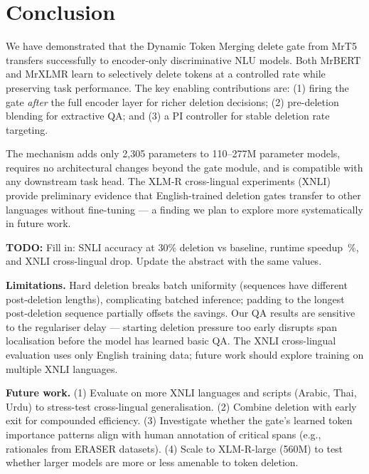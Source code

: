\documentclass[11pt,a4paper]{article}
\newcommand{\todo}[1]{\begin{mdframed}[style=todostyle]\textcolor{todocolor}{\textbf{TODO:}} #1\end{mdframed}}
\begin{document}
\section{Conclusion}
\label{sec:conclusion}

We have demonstrated that the Dynamic Token Merging delete gate from MrT5 transfers successfully to encoder-only discriminative NLU models. Both MrBERT and MrXLMR learn to selectively delete tokens at a controlled rate while preserving task performance. The key enabling contributions are: (1) firing the gate \emph{after} the full encoder layer for richer deletion decisions; (2) pre-deletion blending for extractive QA; and (3) a PI controller for stable deletion rate targeting.

The mechanism adds only 2,305 parameters to 110--277M parameter models, requires no architectural changes beyond the gate module, and is compatible with any downstream task head. The XLM-R cross-lingual experiments (XNLI) provide preliminary evidence that English-trained deletion gates transfer to other languages without fine-tuning --- a finding we plan to explore more systematically in future work.

\todo{Fill in: SNLI accuracy at 30\% deletion vs baseline, runtime speedup~\%, and XNLI cross-lingual drop. Update the abstract with the same values.}

\textbf{Limitations.} Hard deletion breaks batch uniformity (sequences have different post-deletion lengths), complicating batched inference; padding to the longest post-deletion sequence partially offsets the savings. Our QA results are sensitive to the regulariser delay --- starting deletion pressure too early disrupts span localisation before the model has learned basic QA. The XNLI cross-lingual evaluation uses only English training data; future work should explore training on multiple XNLI languages.

\textbf{Future work.} (1) Evaluate on more XNLI languages and scripts (Arabic, Thai, Urdu) to stress-test cross-lingual generalisation. (2) Combine deletion with early exit for compounded efficiency. (3) Investigate whether the gate's learned token importance patterns align with human annotation of critical spans (e.g., rationales from ERASER datasets). (4) Scale to XLM-R-large (560M) to test whether larger models are more or less amenable to token deletion.



\end{document}
